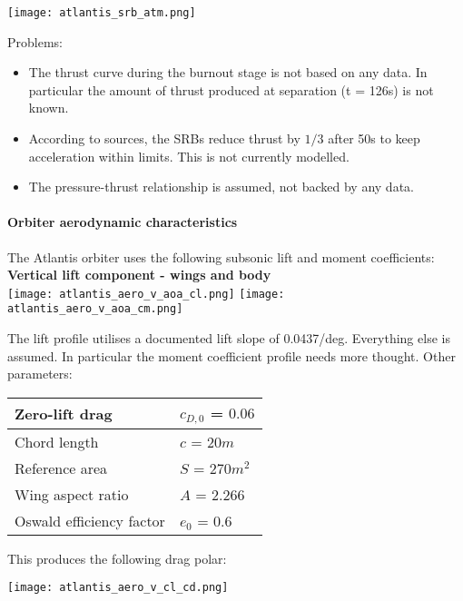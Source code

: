 \documentclass[Orbiter User Manual.tex]{subfiles}
\begin{document}
\texttt{[image: atlantis\_srb\_atm.png]}

\noindent
Problems:
\begin{itemize}
\item The thrust curve during the burnout stage is not based on any data. In particular the amount of thrust produced at separation (t = 126s) is not known.
\item According to sources, the SRBs reduce thrust by $1/3$ after 50s to keep acceleration within limits. This is not currently modelled.
\item The pressure-thrust relationship is assumed, not backed by any data.
\end{itemize}

\paragraph{Orbiter aerodynamic characteristics}
The Atlantis orbiter uses the following subsonic lift and moment coefficients:\\

\textbf{\large Vertical lift component - wings and body}\\

\texttt{[image: atlantis\_aero\_v\_aoa\_cl.png]}
\texttt{[image: atlantis\_aero\_v\_aoa\_cm.png]}

The lift profile utilises a documented lift slope of 0.0437/deg. Everything else is assumed. In particular the moment coefficient profile needs more thought. Other parameters:

\begin{table}[H]
\centering
\begin{tabular}{|l|l|}
\hline
Zero-lift drag & $c_{D,0}$ = $0.06$ \\ \hline
Chord length & $c$ = $20 m$ \\ \hline
Reference area & $S$ = $270 m^2$ \\ \hline
Wing aspect ratio & $A$ = $2.266$ \\ \hline
Oswald efficiency factor & $e_0$ = $0.6$ \\ \hline
\end{tabular}
\end{table}

\begin{center}
This produces the following drag polar:

\texttt{[image: atlantis\_aero\_v\_cl\_cd.png]}
\end{center}
\end{document}
